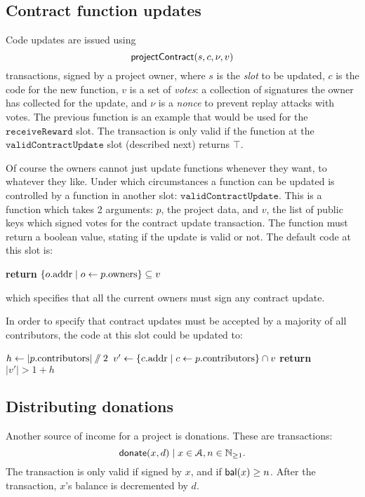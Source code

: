 \subsection{Contract function updates}

Code updates are issued using
\[
    \mathsf{projectContract}\small{\lparen s, c, \nu, v\rparen}
\]
transactions, signed by a project owner, where $s$ is the \emph{slot} to be
updated, $c$ is the code for the new function, $v$ is a set of \emph{votes}: a
collection of signatures the owner has collected for the update, and $\nu$ is a
\emph{nonce} to prevent replay attacks with votes. The previous function is an
example that would be used for the $\mathtt{receiveReward}$ slot. The
transaction is only valid if the function at the $\mathtt{validContractUpdate}$
slot (described next) returns $\top$.

Of course the owners cannot just update functions whenever they want, to
whatever they like. Under which circumstances a function can be updated is
controlled by a function in another slot: $\mathtt{validContractUpdate}$. This
is a function which takes 2 arguments: $p$, the project data, and $v$, the list
of public keys which signed votes for the contract update transaction. The
function must return a boolean value, stating if the update is valid or not. The
default code at this slot is:
\begin{algorithmic}[1]
\State \textbf{return} $\{ o.{\mathrm{addr}} \mid o \gets p.{\mathrm{owners}} \} \subseteq v$
\EndProcedure
\end{algorithmic}
which specifies that all the current owners must sign any contract update.

In order to specify that contract updates must be accepted by a majority of all
contributors, the code at this slot could be updated to:
\begin{algorithmic}[1]
\State $h \gets |p.{\mathrm{contributors}}| \sslash 2$
\State $v' \gets \{ c.{\mathrm{addr}} \mid c \gets p.{\mathrm{contributors}} \} \cap v$
\State \textbf{return} $|v'| > 1 + h$
\EndProcedure
\end{algorithmic}

\subsection{Distributing donations}

Another source of income for a project is donations. These are transactions:
\[
\mathsf{donate}\small{\lparen x, d\rparen} \mid x \in \mathcal{A}, n \in \mathbb{N}_{\geq 1}.
\]
The transaction is only valid if signed by $x$, and if $\mathsf{bal}(x) \geq n$. After
the transaction, $x$'s balance is decremented by $d$.

